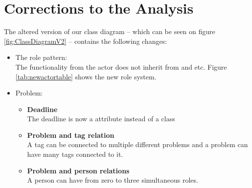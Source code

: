 \section{Corrections to the Analysis}
\label{sec:correctionstotheanalysis}

The altered version of our class diagram -- which can be seen on figure \ref{fig:ClassDiagramV2} -- contains the following changes:
\begin{itemize}	
	\item The role pattern: \\
	The functionality from the actor \admin[] does not inherit from \astaff[] and \aclient[] etc. Figure \ref{tab:newactortable} shows the new role system.   
	\item Problem: 
	\begin{itemize}
		\item \textbf{Deadline} \\
					The deadline is now a attribute instead of a class
		\item \textbf{Problem and tag relation} \\
					A tag can be connected to multiple different problems and a problem can have many tags connected to it. 
		\item \textbf{Problem and person relations} \\
					A person can have from zero to three simultaneous roles.				
	\end{itemize}
\end{itemize}